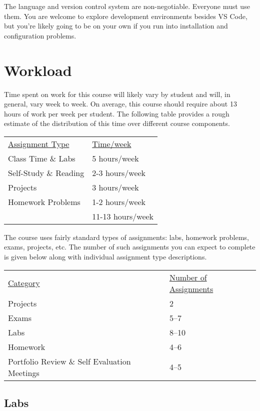 \documentclass[10pt]{article}
\begin{document}
The language and version control system are non-negotiable. Everyone must use them. You are welcome to explore 
development environments besides VS Code, but you're likely going to be on your own if you run into installation 
and configuration problems. 

  
\section{Workload}


Time spent on work for this course will likely vary by student and will, in general, vary week to week. On average, this course should require about 13 hours of work per week per student.  The following table provides a rough estimate of the distribution of this time over different course components.
\begin{center}
\begin{tabular}{ll}
\underline{Assignment Type} & \underline{Time/week} \\
Class Time \& Labs       & 5 hours/week \\
Self-Study \& Reading & 2-3 hours/week \\
Projects           & 3 hours/week \\
Homework Problems   & 1-2 hours/week \\
\bottomrule
 & 11-13 hours/week
\end{tabular}
\end{center}


The course uses fairly standard types of assignments: labs, homework problems, exams, projects, etc. The number of such assignments you can expect to complete is given below along with individual assignment type descriptions.
\begin{center}
  \begin{tabular}{ll}
    \underline{Category} & \underline{Number of Assignments} \\
    Projects & 2 \\
    Exams & 5--7 \\    
    Labs & 8--10 \\
    Homework & 4--6 \\
    Portfolio Review \& Self Evaluation Meetings & 4--5 \\
  \end{tabular}
\end{center}

\subsection*{Labs}
\end{document}
